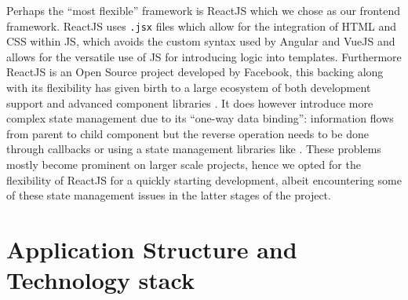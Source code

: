 \documentclass[\version]{l4proj}
\begin{document}
Perhaps the ``most flexible'' framework is ReactJS which we chose as our frontend framework.
ReactJS uses \lstinline{.jsx} files which allow for the integration of HTML and CSS within JS, which avoids the custom syntax used by Angular and VueJS and allows for the versatile use of JS for introducing logic into templates.
Furthermore ReactJS is an Open Source project developed by Facebook, this backing along with its flexibility has given birth to a large ecosystem of both development support and advanced component libraries \autocite{wohlgethanSupportingWebDevelopmentDecisions2018}.
It does however introduce more complex state management due to its ``one-way data binding'': information flows from parent to child component but the reverse operation needs to be done through callbacks or using a state management libraries like \textcite{Redux2020}.
These problems mostly become prominent on larger scale projects, hence we opted for the flexibility of ReactJS for a quickly starting development, albeit encountering some of these state management issues in the latter stages of the project.

\section{Application Structure and Technology stack}
\end{document}
